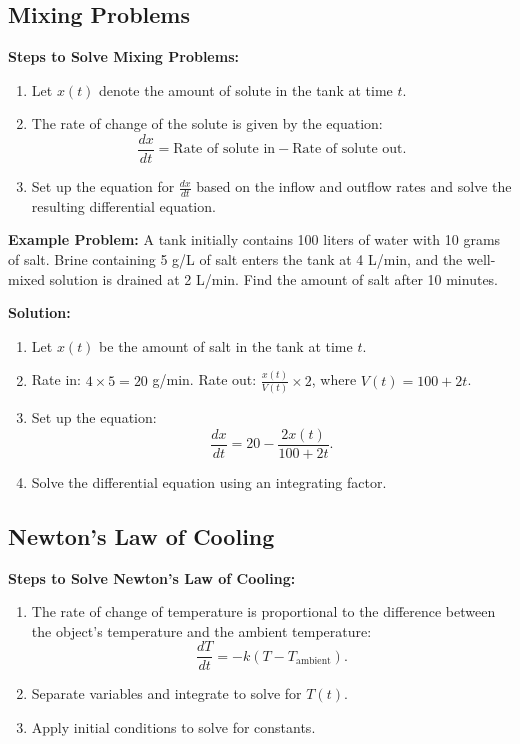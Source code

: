 \documentclass[10pt]{article}
\begin{document}
\subsection*{Mixing Problems}
\textbf{Steps to Solve Mixing Problems:}
\begin{enumerate}
    \item Let \( x(t) \) denote the amount of solute in the tank at time \( t \).
    \item The rate of change of the solute is given by the equation:
    \[
    \frac{dx}{dt} = \text{Rate of solute in} - \text{Rate of solute out}.
    \]
    \item Set up the equation for \( \frac{dx}{dt} \) based on the inflow and outflow rates and solve the resulting differential equation.
\end{enumerate}

\textbf{Example Problem:} A tank initially contains 100 liters of water with 10 grams of salt. Brine containing 5 g/L of salt enters the tank at 4 L/min, and the well-mixed solution is drained at 2 L/min. Find the amount of salt after 10 minutes.

\textbf{Solution:}
\begin{enumerate}
    \item Let \( x(t) \) be the amount of salt in the tank at time \( t \).
    \item Rate in: \( 4 \times 5 = 20 \) g/min. Rate out: \( \frac{x(t)}{V(t)} \times 2 \), where \( V(t) = 100 + 2t \).
    \item Set up the equation:
    \[
    \frac{dx}{dt} = 20 - \frac{2x(t)}{100 + 2t}.
    \]
    \item Solve the differential equation using an integrating factor.
\end{enumerate}

\subsection*{Newton’s Law of Cooling}
\textbf{Steps to Solve Newton’s Law of Cooling:}
\begin{enumerate}
    \item The rate of change of temperature is proportional to the difference between the object’s temperature and the ambient temperature:
    \[
    \frac{dT}{dt} = -k(T - T_{\text{ambient}}).
    \]
    \item Separate variables and integrate to solve for \( T(t) \).
    \item Apply initial conditions to solve for constants.
\end{enumerate}
\end{document}
